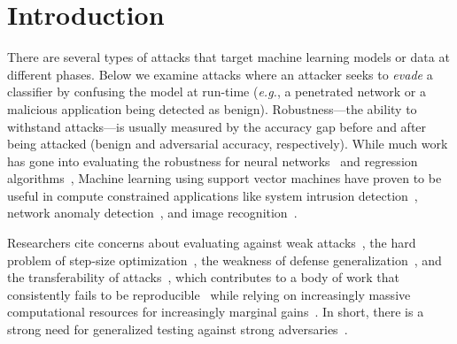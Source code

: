 \documentclass[fonts]{icst}
\begin{document}

\maketitle




%



\section{Introduction}
There are several types of attacks that target machine learning models or data at different phases.
Below we examine attacks where an attacker seeks to \emph{evade} a classifier by confusing the model at run-time (\textit{e.g.}, a penetrated network or a malicious application being detected as benign).
Robustness---the ability to withstand attacks---is usually measured by the accuracy gap before and after being attacked (benign and adversarial accuracy, respectively).
While much work has gone into evaluating the robustness for neural networks~\cite{szegedy2013intriguing,madry2017towards,croce2020reliable} and regression algorithms~\cite{deka2019adversarial},
Machine learning using support vector machines have proven to be useful in compute constrained applications like system intrusion detection~\cite{kim2003network}, network anomaly detection~\cite{mehmood2015svm}, and image recognition~\cite{tzotsos2008support}.


Researchers cite concerns about evaluating against weak attacks~\cite{uesato2018adversarial,carlini2019evaluating}, the hard problem of step-size optimization~\cite{li2016general}, the weakness of defense generalization~\cite{stutz2019confidence}, and the transferability of attacks~\cite{demontis2019adversarial}, which contributes to a body of work that consistently fails to be reproducible~\cite{croce2020reliable} while  relying on increasingly massive computational resources for increasingly marginal gains~\cite{desislavov2021compute}.
In short, there is a strong need for generalized testing against strong adversaries~\cite{carlini2019evaluating}.
\end{document}
